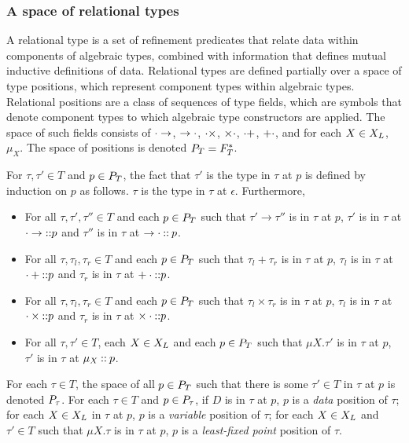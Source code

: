 \subsubsection{A space of relational types}
\label{sec:rel-type-space}
A relational type is a set of refinement predicates that relate data
within components of algebraic types, combined with information that
defines mutual inductive definitions of data.
%
Relational types are defined partially over a space of type positions,
which represent component types within algebraic types.
%
Relational positions are a class of sequences of type fields, which
are symbols that denote component types to which algebraic type
constructors are applied.
%
The space of such fields consists of $\cdot \to$, $\to \cdot$,
$\cdot \times$, $\times \cdot$, $\cdot +$, $+ \cdot$, and for
each $X \in X_L$, $\mu_X$.
%
The space of positions is denoted $P_T = F_T^{*}$.
%
\begin{defn}
  \label{defn:ty-at-pos}
  For $\tau, \tau' \in T$ and $p \in P_T$, the fact that $\tau'$ is
  the type in $\tau$ at $p$ is defined by induction on $p$ as follows.
  $\tau$ is the type in $\tau$ at $\epsilon$. Furthermore,
  \begin{itemize}
  \item %
    For all $\tau, \tau', \tau'' \in T$ and each $p \in P_T$ such
    that $\tau' \to \tau''$ is in $\tau$ at $p$, $\tau'$ is in $\tau$
    at $\cdot \to \mathbin{::} p$ and $\tau''$ is in $\tau$ at
    $\to \cdot \mathbin{::} p$.
  \item %
    For all $\tau, \tau_l, \tau_r \in T$ and each $p \in P_T$ such
    that $\tau_l + \tau_r$ is in $\tau$ at $p$, $\tau_l$ is in $\tau$
    at $\cdot + \mathbin{::} p$ and $\tau_r$ is in $\tau$ at
    $+ \cdot \mathbin{::} p$.
  \item %
    For all $\tau, \tau_l, \tau_r \in T$ and each $p \in P_T$ such
    that $\tau_l \times \tau_r$ is in $\tau$ at $p$, $\tau_l$ is in
    $\tau$ at $\cdot \times \mathbin{::} p$ and $\tau_r$ is in $\tau$ at
    $\times \cdot \mathbin{::} p$.
  \item %
    For all $\tau, \tau' \in T$, each $X \in X_L$ and each
    $p \in P_T$ such that $\mu X. \tau'$ is in $\tau$ at $p$,
    $\tau'$ is in $\tau$ at $\mu_X \mathbin{::} p$.
  \end{itemize}
\end{defn}
%
For each $\tau \in T$, the space of all $p \in P_T$ such that there
is some $\tau' \in T$ in $\tau$ at $p$ is denoted $P_{\tau}$.
For each $\tau \in T$ and $p \in P_{\tau}$, if $D$ is in $\tau$
at $p$, $p$ is a \emph{data} position of $\tau$;
for each $X \in X_L$ in $\tau$ at $p$, $p$ is a \emph{variable}
position of $\tau$; %
for each $X \in X_L$ and $\tau' \in T$ such that $\mu X. \tau$ is
in $\tau$ at $p$, $p$ is a \emph{least-fixed point} position of
$\tau$.

